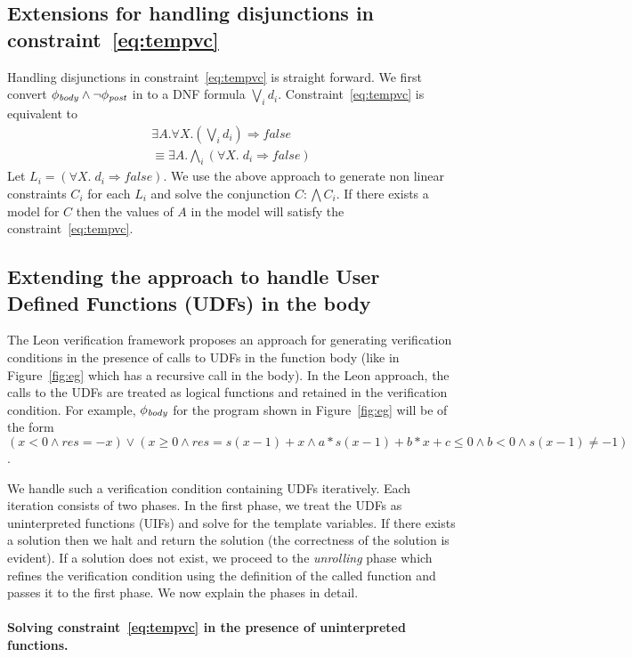 \documentclass[a4paper,10pt]{article}
\begin{document}
\subsection{Extensions for handling disjunctions in constraint~\ref{eq:tempvc}}

Handling disjunctions in constraint~\ref{eq:tempvc} is straight forward. We first
convert $\mathit{\phi_{body}} \wedge \neg \mathit{\phi_{post}}$ in to a DNF formula $\bigvee_i d_i$.
Constraint~\ref{eq:tempvc} is equivalent to 
%
\begin{align}
\exists A. \forall X. (\bigvee_i d_i) \Rightarrow false \\
\equiv \exists A. \bigwedge_i (\forall X. \; d_i \Rightarrow false)
\end{align}
%
Let $L_i =  (\forall X. \; d_i \Rightarrow false)$. We use the above approach to generate non linear constraints $C_i$ for each $L_i$ and solve the conjunction $C: \bigwedge C_i$.
If there exists a model for $C$ then the values of $A$ in the model will satisfy the 
constraint~\ref{eq:tempvc}.

\subsection{Extending the approach to handle User Defined Functions (UDFs) in the body}

The Leon verification framework proposes an approach for generating verification conditions in the presence of calls to UDFs in the function body (like in Figure~\ref{fig:eg} which has a recursive call in the body). In the Leon approach, the calls to the UDFs are treated as logical functions and retained in the verification condition. For example, $\mathit{\phi_{body}}$ for the program shown in Figure~\ref{fig:eg} will  be of the form 
$(x < 0 \wedge res = -x) \vee (x \ge 0 \wedge res = s(x-1) + x \wedge a*s(x-1) + b*x + c \le 0 \wedge b < 0 \wedge s(x-1) \ne -1)$.

We handle such a verification condition containing UDFs iteratively. Each iteration consists of two phases. In the first phase, we treat the UDFs as uninterpreted functions (UIFs) and solve for the template variables.
If there exists a solution then we halt and return the solution (the correctness of the solution is evident).
If a solution does not exist, we proceed to the \emph{unrolling} phase which refines the verification condition using the definition of the called function and passes it to the 
first phase. We now explain the phases in detail.

\paragraph{Solving constraint~\ref{eq:tempvc} in the presence of uninterpreted functions.}
\end{document}
